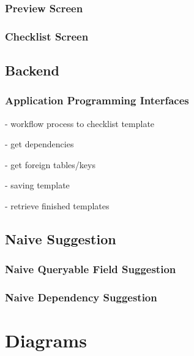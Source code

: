 \subsubsection{Preview Screen}

\subsubsection{Checklist Screen}

\subsection{Backend}

\subsubsection{Application Programming Interfaces}
- workflow process to checklist template

- get dependencies

- get foreign tables/keys

- saving template

- retrieve finished templates


\subsection{Naive Suggestion}
\subsubsection{Naive Queryable Field Suggestion}
\subsubsection{Naive Dependency Suggestion}

\section{Diagrams}
